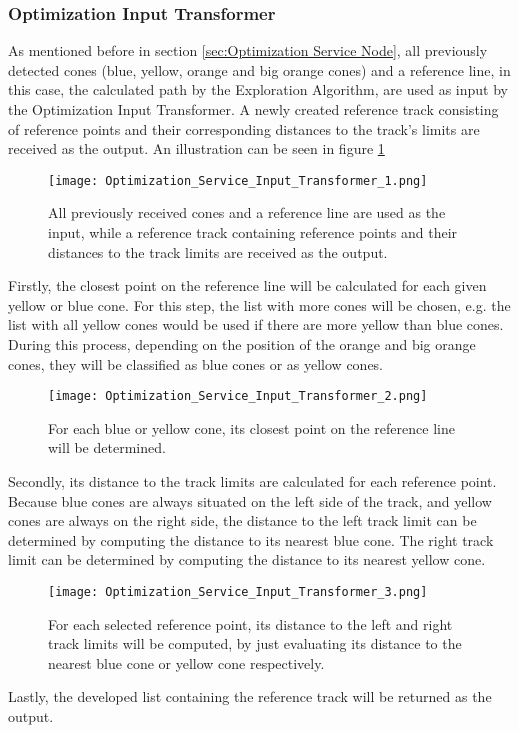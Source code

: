\subsubsection{Optimization Input Transformer} \label{sec:Optimization Input Transformer}
As mentioned before in section \ref{sec:Optimization Service Node}, all previously detected cones (blue, yellow, orange and big orange cones) and a reference line, in this case, the calculated path by the Exploration Algorithm, are used as input by the Optimization Input Transformer. A newly created reference track consisting of reference points and their corresponding distances to the track's limits are received as the output. An illustration can be seen in figure \ref{fig:Optimization Service Input Transformer 1}
\begin{figure}[H]
    \centering
    \texttt{[image: Optimization\_Service\_Input\_Transformer\_1.png]}
    \caption{All previously received cones and a reference line are used as the input, while a reference track containing reference points and their distances to the track limits are received as the output.}
    \label{fig:Optimization Service Input Transformer 1}
\end{figure}
Firstly, the closest point on the reference line will be calculated for each given yellow or blue cone. For this step, the list with more cones will be chosen, e.g. the list with all yellow cones would be used if there are more yellow than blue cones. During this process, depending on the position of the orange and big orange cones, they will be classified as blue cones or as yellow cones.
\begin{figure}[H]
    \centering
    \texttt{[image: Optimization\_Service\_Input\_Transformer\_2.png]}
    \caption{For each blue or yellow cone, its closest point on the reference line will be determined.}
    \label{fig:Optimization Service Input Transformer 2}
\end{figure}
Secondly, its distance to the track limits are calculated for each reference point. Because blue cones are always situated on the left side of the track, and yellow cones are always on the right side, the distance to the left track limit can be determined by computing the distance to its nearest blue cone. The right track limit can be determined by computing the distance to its nearest yellow cone.
\begin{figure}[H]
    \centering
    \texttt{[image: Optimization\_Service\_Input\_Transformer\_3.png]}
    \caption{For each selected reference point, its distance to the left and right track limits will be computed, by just evaluating its distance to the nearest blue cone or yellow cone respectively.}
    \label{fig:Optimization Service Input Transformer 3}
\end{figure}
Lastly, the developed list containing the reference track will be returned as the output.

